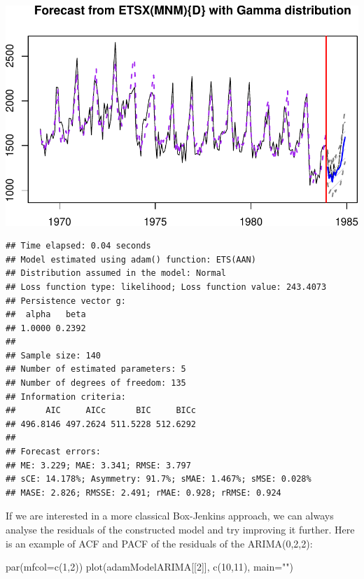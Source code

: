 \documentclass[
]{book}
\newenvironment{Shaded}{\begin{snugshade}}{\end{snugshade}}
\newcommand{\AttributeTok}[1]{\textcolor[rgb]{0.77,0.63,0.00}{#1}}
\newcommand{\DecValTok}[1]{\textcolor[rgb]{0.00,0.00,0.81}{#1}}
\newcommand{\FunctionTok}[1]{\textcolor[rgb]{0.00,0.00,0.00}{#1}}
\newcommand{\NormalTok}[1]{#1}
\newcommand{\StringTok}[1]{\textcolor[rgb]{0.31,0.60,0.02}{#1}}
\theoremstyle{definition}
\theoremstyle{definition}
\theoremstyle{definition}
\theoremstyle{definition}
\theoremstyle{remark}
\begin{document}
\includegraphics{adam_files/figure-latex/unnamed-chunk-61-1.pdf}

\begin{verbatim}
## Time elapsed: 0.04 seconds
## Model estimated using adam() function: ETS(AAN)
## Distribution assumed in the model: Normal
## Loss function type: likelihood; Loss function value: 243.4073
## Persistence vector g:
##  alpha   beta 
## 1.0000 0.2392 
## 
## Sample size: 140
## Number of estimated parameters: 5
## Number of degrees of freedom: 135
## Information criteria:
##      AIC     AICc      BIC     BICc 
## 496.8146 497.2624 511.5228 512.6292 
## 
## Forecast errors:
## ME: 3.229; MAE: 3.341; RMSE: 3.797
## sCE: 14.178%; Asymmetry: 91.7%; sMAE: 1.467%; sMSE: 0.028%
## MASE: 2.826; RMSSE: 2.491; rMAE: 0.928; rRMSE: 0.924
\end{verbatim}

If we are interested in a more classical Box-Jenkins approach, we can always analyse the residuals of the constructed model and try improving it further. Here is an example of ACF and PACF of the residuals of the ARIMA(0,2,2):

\begin{Shaded}
\begin{Highlighting}[]
\FunctionTok{par}\NormalTok{(}\AttributeTok{mfcol=}\FunctionTok{c}\NormalTok{(}\DecValTok{1}\NormalTok{,}\DecValTok{2}\NormalTok{))}
\FunctionTok{plot}\NormalTok{(adamModelARIMA[[}\DecValTok{2}\NormalTok{]], }\FunctionTok{c}\NormalTok{(}\DecValTok{10}\NormalTok{,}\DecValTok{11}\NormalTok{), }\AttributeTok{main=}\StringTok{""}\NormalTok{)}
\end{Highlighting}
\end{Shaded}
\end{document}
